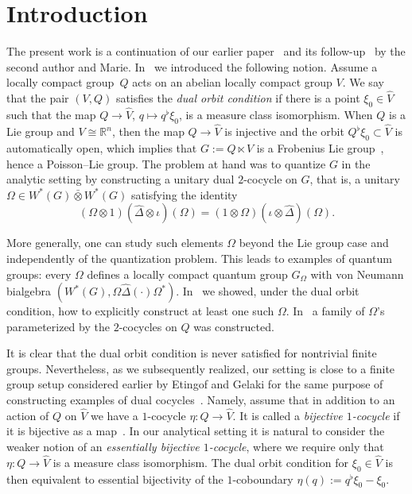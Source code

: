 \documentclass[a4paper,11pt,reqno]{amsart}
\numberwithin{equation}{section}
\theoremstyle{remark}
\theoremstyle{definition}
\newcommand\Dhat{{\hat\Delta}}
\newcommand{\R}{{\mathbb R}}
\begin{document}
\section*{Introduction}

The present work is a continuation of our earlier paper~\cite{BGNT3} and its follow-up~\cite{GM} by the second author and Marie. In~\cite{BGNT3} we introduced the following notion. Assume a locally compact group~$Q$ acts on an abelian locally compact group $V$. We say that the pair $(V,Q)$ satisfies the \emph{dual orbit condition} if there is a point $\xi_0\in\hat V$ such that the map $Q\to \hat V$, $q\mapsto q^\flat\xi_0$, is a measure class isomorphism. When $Q$ is a Lie group and $V\cong\R^n$, then the map $Q\to\hat V$ is injective and the orbit $Q^\flat\xi_0\subset\hat V$ is automatically open, which implies that $G:=Q\ltimes V$ is a Frobenius Lie group~\cite{MR0556091}, hence a Poisson--Lie group. The problem at hand was to quantize $G$ in the analytic setting by constructing a unitary dual $2$-cocycle on $G$, that is, a unitary $\Omega\in W^*(G)\bar\otimes W^*(G)$ satisfying the identity
$$
(\Omega\otimes1)(\Dhat\otimes\iota)(\Omega)=(1\otimes\Omega)(\iota\otimes\Dhat)(\Omega).
$$

More generally, one can study such elements $\Omega$ beyond the Lie group case and independently of the quantization problem. This leads to examples of quantum groups: every $\Omega$ defines a locally compact quantum group $G_\Omega$ with von Neumann bialgebra $(W^*(G),\Omega\Dhat(\cdot)\Omega^*)$. In~\cite{BGNT3} we showed, under the dual orbit condition, how to explicitly construct at least one such $\Omega$. In~\cite{GM} a family of $\Omega$'s parameterized by the $2$-cocycles on $Q$ was constructed.

It is clear that the dual orbit condition is never satisfied for nontrivial finite groups. Nevertheless, as we subsequently realized, our setting is close to a finite group setup considered earlier by Etingof and Gelaki for the same purpose of constructing examples of dual cocycles~\cite{EG}. Namely, assume that in addition to an action of $Q$ on $\hat V$ we have a $1$-cocycle $\eta\colon Q\to\hat V$. It is called a \emph{bijective $1$-cocycle} if it is bijective as a map~\cites{MR1722951,EG}. In our analytical setting it is natural to consider the weaker notion of an \emph{essentially bijective $1$-cocycle}, where we require only that $\eta\colon Q\to\hat V$ is a measure class isomorphism. The dual orbit condition for $\xi_0\in\hat V$ is then equivalent to essential bijectivity of the $1$-coboundary $\eta(q):=q^\flat\xi_0-\xi_0$.
\end{document}
